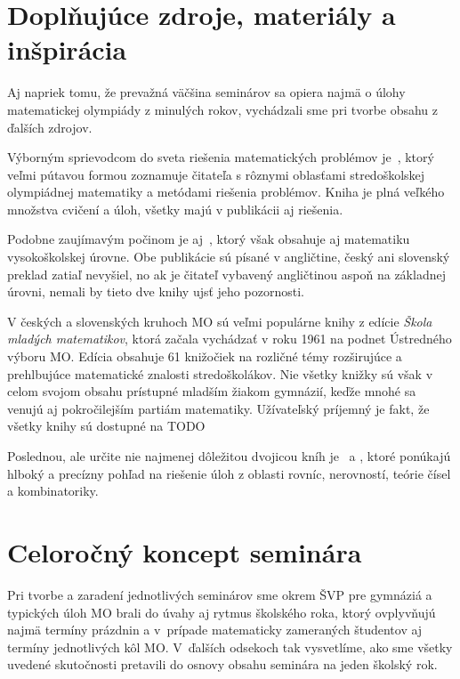 \section{Doplňujúce zdroje, materiály a inšpirácia}

Aj napriek tomu, že prevažná väčšina seminárov sa opiera najmä o úlohy matematickej olympiády z minulých rokov, vychádzali sme pri tvorbe obsahu z ďalších zdrojov.

Výborným sprievodcom do sveta riešenia matematických problémov je~\cite{holton2010}, ktorý veľmi pútavou formou zoznamuje čitateľa s rôznymi oblasťami stredoškolskej olympiádnej matematiky a metódami riešenia problémov. Kniha je plná veľkého množstva cvičení a úloh, všetky majú v publikácii aj riešenia.

Podobne zaujímavým počinom je aj~\cite{zeitz2007}, ktorý však obsahuje aj matematiku vysokoškolskej úrovne. Obe publikácie sú písané v angličtine, český ani slovenský preklad zatiaľ nevyšiel, no ak je čitateľ vybavený angličtinou aspoň na základnej úrovni, nemali by tieto dve knihy ujsť jeho pozornosti.

V českých a slovenských kruhoch MO sú veľmi populárne knihy z edície \textit{Škola mladých matematikov}, ktorá začala vychádzať v roku 1961 na podnet Ústredného výboru MO. Edícia obsahuje 61 knižočiek na rozličné témy rozširujúce a prehlbujúce matematické znalosti stredoškolákov. Nie všetky knižky sú však v celom svojom obsahu prístupné mladším žiakom gymnázií, keďže mnohé sa venujú aj pokročilejším partiám matematiky. Užívateľský príjemný je fakt, že všetky knihy sú dostupné na TODO

Poslednou, ale určite nie najmenej dôležitou dvojicou kníh je~\cite{herman2004} a \cite{herman2011} , ktoré ponúkajú hlboký a precízny pohľad na riešenie úloh z oblasti rovníc, nerovností, teórie čísel a kombinatoriky.



\section{Celoročný koncept seminára}

Pri tvorbe a zaradení jednotlivých seminárov sme okrem ŠVP pre gymnáziá a typických úloh MO brali do úvahy aj rytmus školského roka, ktorý ovplyvňujú najmä termíny prázdnin a v~prípade matematicky zameraných študentov aj termíny jednotlivých kôl MO. V~ďalších odsekoch tak vysvetlíme, ako sme všetky uvedené skutočnosti pretavili do osnovy obsahu seminára na jeden školský rok.

